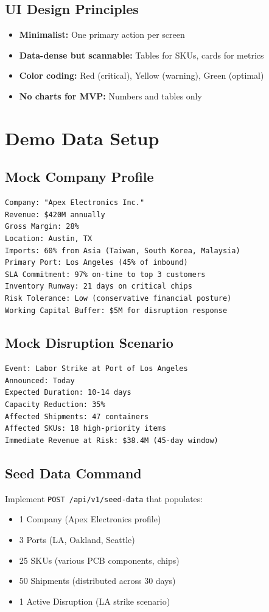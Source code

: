 \documentclass[11pt]{article}
\begin{document}
\subsection{UI Design Principles}
\begin{itemize}
    \item \textbf{Minimalist:} One primary action per screen
    \item \textbf{Data-dense but scannable:} Tables for SKUs, cards for metrics
    \item \textbf{Color coding:} Red (critical), Yellow (warning), Green (optimal)
    \item \textbf{No charts for MVP:} Numbers and tables only
\end{itemize}

\section{Demo Data Setup}

\subsection{Mock Company Profile}
\begin{lstlisting}[basicstyle=\ttfamily\small]
Company: "Apex Electronics Inc."
Revenue: $420M annually
Gross Margin: 28%
Location: Austin, TX
Imports: 60% from Asia (Taiwan, South Korea, Malaysia)
Primary Port: Los Angeles (45% of inbound)
SLA Commitment: 97% on-time to top 3 customers
Inventory Runway: 21 days on critical chips
Risk Tolerance: Low (conservative financial posture)
Working Capital Buffer: $5M for disruption response
\end{lstlisting}

\subsection{Mock Disruption Scenario}
\begin{lstlisting}[basicstyle=\ttfamily\small]
Event: Labor Strike at Port of Los Angeles
Announced: Today
Expected Duration: 10-14 days
Capacity Reduction: 35%
Affected Shipments: 47 containers
Affected SKUs: 18 high-priority items
Immediate Revenue at Risk: $38.4M (45-day window)
\end{lstlisting}

\subsection{Seed Data Command}
Implement \texttt{POST /api/v1/seed-data} that populates:
\begin{itemize}
    \item 1 Company (Apex Electronics profile)
    \item 3 Ports (LA, Oakland, Seattle)
    \item 25 SKUs (various PCB components, chips)
    \item 50 Shipments (distributed across 30 days)
    \item 1 Active Disruption (LA strike scenario)
\end{itemize}
\end{document}
